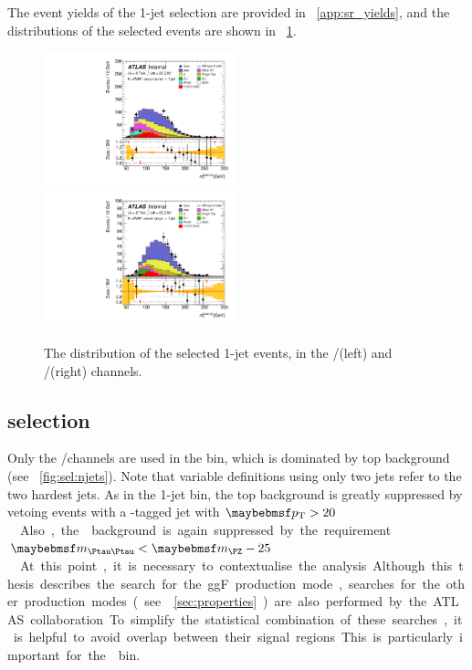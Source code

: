 The event yields of the 1-jet selection are provided in \Appendix~\ref{app:sr_yields}, 
and the \mt distributions of the selected events are shown in \Figure~\ref{fig:sel:1j:mt}.

\begin{figure}
	\includegraphics[width=0.495\textwidth]{tex/selection/emme_CutFRecoil_1jet_MT_TrackHWW_Clj_mh125_lin}
	\hfill
	\includegraphics[width=0.495\textwidth]{tex/selection/eemm_CutFRecoil_1jet_MT_TrackHWW_Clj_mh125_lin}
	\caption{The \mt distribution of the selected 1-jet events, in the \emch/\mech (left) and 
	\eech/\mmch (right) channels.}
	\label{fig:sel:1j:mt}
\end{figure}



\subsection{\twojet selection}
\label{sec:selection:2j}

Only the \emch/\mech channels are used in the \twojet bin, which is dominated by top 
background (see \Figure~\ref{fig:sel:njets}). Note that variable definitions using only 
two jets refer to the two hardest jets. As in the 1-jet bin, the top background is 
greatly suppressed by vetoing events with a \Pbottom-tagged jet with 
\unit{$\pt > 20$}{\GeV}. Also, the \DYtt background is again suppressed by the 
requirement \unit{$\mtautau < \mZ - 25$}{\GeV}.

At this point, it is necessary to contextualise the analysis. Although this thesis 
describes the search for the ggF production mode, searches for the other production modes 
(see \Section~\ref{sec:properties}) are also performed by the ATLAS collaboration. To 
simplify the statistical combination of these searches, it is helpful to avoid overlap 
between their signal regions. This is particularly important for the \twojet bin.

